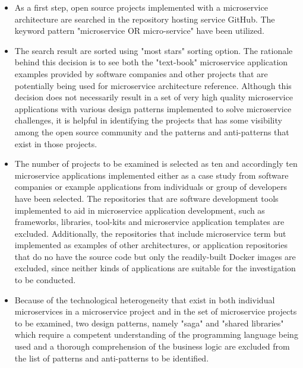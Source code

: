 \documentclass{Configuration_Files/PoliMi3i_thesis}
\begin{document}
\begin{itemize}
    \item As a first step, open source projects implemented with a microservice architecture are searched in the repository hosting service GitHub.
    The keyword pattern "microservice OR micro-service" have been utilized.

    \item The search result are sorted using "most stars" sorting option.
    The rationale behind this decision is to see both the "text-book" microservice application examples provided by software companies and other projects that are potentially being used for microservice architecture reference.
    Although this decision does not necessarily result in a set of very high quality microservice applications with various design patterns implemented to solve microservice challenges, it is helpful in identifying the projects that has some visibility among the open source community and the patterns and anti-patterns that exist in those projects.
    
    \item The number of projects to be examined is selected as ten and accordingly ten microservice applications implemented either as a case study from software companies or example applications from individuals or group of developers have been selected.
    The repositories that are software development tools implemented to aid in microservice application development, such as frameworks, libraries, tool-kits and microservice application templates are excluded.
    Additionally, the repositories that include microservice term but implemented as examples of other architectures, or application repositories that do no have the source code but only the readily-built Docker images are excluded, since neither kinds of applications are suitable for the investigation to be conducted.
    
    \item Because of the technological heterogeneity that exist in both individual microservices in a microservice project and in the set of microservice projects to be examined, two design patterns, namely "saga" and "shared libraries" which require a competent understanding of the programming language being used and a thorough comprehension of the business logic are excluded from the list of patterns and anti-patterns to be identified.
    

\end{itemize}
\end{document}
